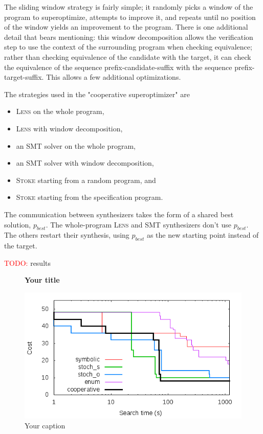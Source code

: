 \documentclass[12pt,twoside]{reedthesis}
\newcommand{\red}[1]{\textcolor{red}{#1}}
\begin{document}
        The sliding window strategy is fairly simple; it randomly picks a window of the program to superoptimize, attempts to improve it, and repeats until no position of the window yields an improvement to the program.
        There is one additional detail that bears mentioning: 
            this window decomposition allows the verification step to use the context of the surrounding program when checking equivalence;
            rather than checking equivalence of the candidate with the target, it can check the equivalence of the sequence prefix-candidate-suffix with the sequence prefix-target-suffix.
        This allows a few additional optimizations.
        
        The strategies used in the "cooperative superoptimizer" are
        \begin{itemize}
            \item \textsc{Lens} on the whole program,
            \item \textsc{Lens} with window decomposition,
            \item an SMT solver on the whole program,
            \item an SMT solver with window decomposition,
            \item \textsc{Stoke} starting from a random program, and
            \item \textsc{Stoke} starting from the specification program.
        \end{itemize}
        The communication between synthesizers takes the form of a shared best solution, $p_{best}$.
        The whole-program \textsc{Lens} and SMT synthesizers don't use $p_{best}$. The others restart their synthesis, using $p_{best}$ as the new starting point instead of the target.
        
        \red{TODO:} results
        
        \begin{figure}
            \centering
            \textbf{Your title}\par\medskip
            \includegraphics[scale=0.5]{scaling}
            \caption{Your caption}
        \end{figure}
\end{document}
